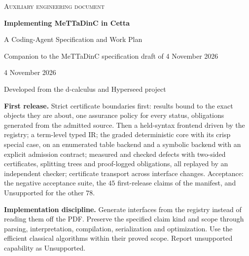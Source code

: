 \documentclass[11pt]{article}
\begin{document}
\hypersetup{pageanchor=false}
\begin{titlepage}
\thispagestyle{empty}
\vspace*{2.2cm}
{\color{dcblue}\large\scshape Auxiliary engineering document\par}
\vspace{1.4cm}
{\LARGE\bfseries Implementing MeTTaDinC in Cetta\par}
\vspace{0.4cm}
{\Large A Coding-Agent Specification and Work Plan\par}
\vspace{1.2cm}
{Companion to the MeTTaDinC specification draft of 4 November 2026\par}
{4 November 2026\par}
\vspace{0.8cm}
{Developed from the d-calculus and Hyperseed project\par}
\vfill
\noindent\begin{minipage}{\textwidth}\small
{\color{dcblue}\bfseries First release.} Strict certificate boundaries first: results bound to the
exact objects they are about, one assurance policy for every status, obligations generated from the
admitted source. Then a held-syntax frontend driven by the registry; a term-level typed IR; the
graded deterministic core with its crisp special case, on an enumerated table backend and a
symbolic backend with an explicit admission contract; measured and checked defects with two-sided
certificates, splitting trees and proof-logged obligations, all replayed by an independent checker;
certificate transport across interface changes. Acceptance: the negative acceptance suite, the $45$
first-release claims of the manifest, and Unsupported for the other $78$.

\smallskip
{\color{dcblue}\bfseries Implementation discipline.} Generate interfaces from the registry instead of
reading them off the PDF. Preserve the specified claim kind and scope through parsing,
interpretation, compilation, serialization and optimization. Use the efficient classical algorithms
within their proved scope. Report unsupported capability as Unsupported.
\end{minipage}
\end{titlepage}
\hypersetup{pageanchor=true}
\end{document}
